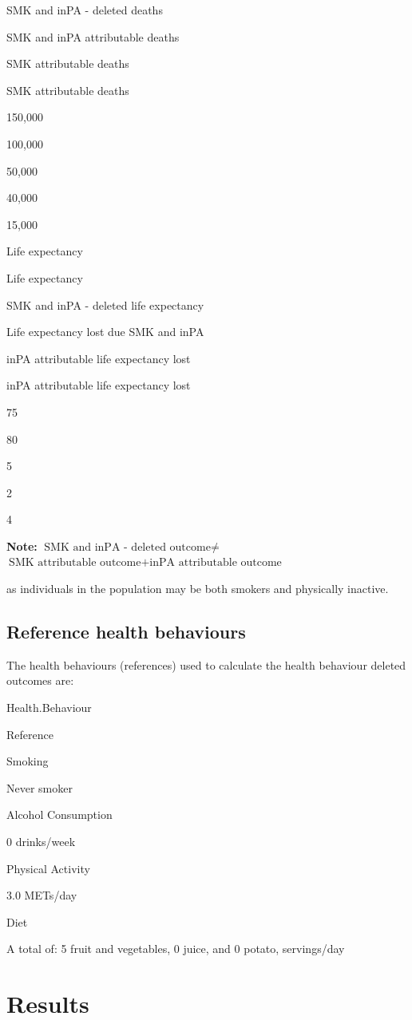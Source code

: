 \documentclass[]{book}
\begin{document}
SMK and inPA - deleted deaths

SMK and inPA attributable deaths

SMK attributable deaths

SMK attributable deaths

150,000

100,000

50,000

40,000

15,000

Life expectancy

Life expectancy

SMK and inPA - deleted life expectancy

Life expectancy lost due SMK and inPA

inPA attributable life expectancy lost

inPA attributable life expectancy lost

75

80

5

2

4

\textbf{Note:} \(\text{SMK and inPA - deleted outcome} \neq\)
\(\text{SMK attributable outcome} + \text{inPA attributable outcome}\)

as individuals in the population may be both smokers and physically inactive.

\hypertarget{reference-health-behaviours}{%
\subsection{Reference health behaviours}\label{reference-health-behaviours}}

The health behaviours (references) used to calculate the health behaviour deleted outcomes are:

Health.Behaviour

Reference

Smoking

Never smoker

Alcohol Consumption

0 drinks/week

Physical Activity

3.0 METs/day

Diet

A total of: 5 fruit and vegetables, 0 juice, and 0 potato, servings/day

\hypertarget{results}{%
\section{Results}\label{results}}
\end{document}
